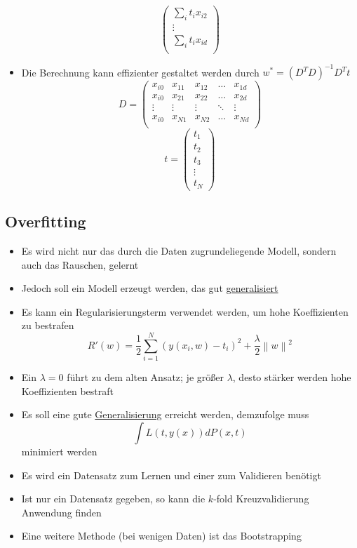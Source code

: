 \documentclass{scrartcl}
\newcommand{\norm}[1]{\left\lVert#1\right\rVert}
\begin{document}
\begin{itemize}
\[\begin{pmatrix}
		\sum_i t_i x_{i2} \\
		\vdots \\
		\sum_i t_i x_{id} \\
	\end{pmatrix} \]
	\item Die Berechnung kann effizienter gestaltet werden durch $ w^* = 
	(D^TD)^{-1} D^Tt $
	\[ D = \begin{pmatrix}
		x_{i0} & x_{11} & x_{12} & \ldots & x_{1d} \\
		x_{i0} & x_{21} & x_{22} & \ldots & x_{2d} \\
		\vdots & \vdots & \vdots & \ddots & \vdots \\
		x_{i0} & x_{N1} & x_{N2} & \ldots & x_{Nd} \\
	\end{pmatrix} \]
	\[ t = \begin{pmatrix}
		t_1 \\
		t_2 \\
		t_3 \\
		\vdots \\
		t_N
	\end{pmatrix} \]
\end{itemize}

\subsection{Overfitting}

\begin{itemize}
	\item Es wird nicht nur das durch die Daten zugrundeliegende Modell, 
	sondern auch das Rauschen, gelernt
	\item Jedoch soll ein Modell erzeugt werden, das gut 
	\underline{generalisiert}
	\item Es kann ein Regularisierungsterm verwendet werden, um hohe 
	Koeffizienten zu bestrafen
	\[ R'(w) = \frac{1}{2} \sum_{i=1}^{N} (y(x_i,w) - t_i)^2 + 
	\frac{\lambda}{2} \norm{w}^2 \]
	\item Ein $ \lambda = 0 $ führt zu dem alten Ansatz; je größer $ \lambda $, 
	desto stärker werden hohe Koeffizienten bestraft
	\item Es soll eine gute \underline{Generalisierung} erreicht werden, 
	demzufolge muss
	\[ \int L(t, y(x)) dP(x,t) \]
	minimiert werden
	\item Es wird ein Datensatz zum Lernen und einer zum Validieren benötigt
	\item Ist nur ein Datensatz gegeben, so kann die $ k $-fold 
	Kreuzvalidierung Anwendung finden
	\item Eine weitere Methode (bei wenigen Daten) ist das Bootstrapping
\end{itemize}
\end{document}

